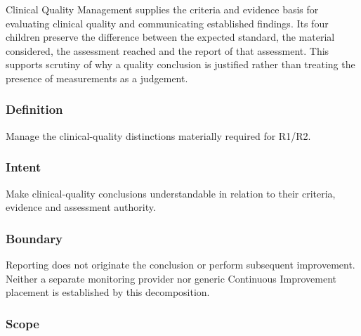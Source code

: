 Clinical Quality Management supplies the criteria and evidence basis for evaluating clinical quality and communicating established findings. Its four children preserve the difference between the expected standard, the material considered, the assessment reached and the report of that assessment. This supports scrutiny of why a quality conclusion is justified rather than treating the presence of measurements as a judgement.

\subsubsection*{Definition}

Manage the clinical-quality distinctions materially required for R1/\allowbreak{}R2.

\subsubsection*{Intent}

Make clinical-quality conclusions understandable in relation to their criteria, evidence and assessment authority.

\subsubsection*{Boundary}

Reporting does not originate the conclusion or perform subsequent improvement. Neither a separate monitoring provider nor generic Continuous Improvement placement is established by this decomposition.

\subsubsection*{Scope}
